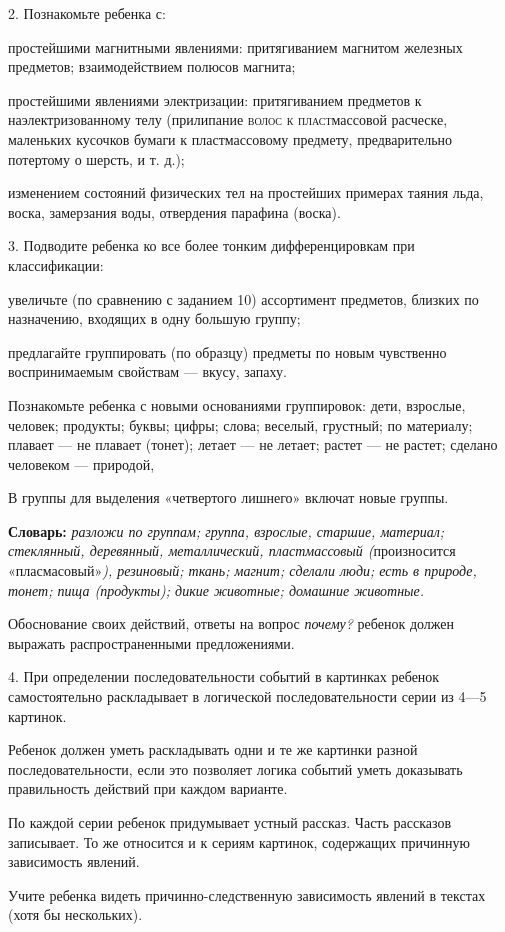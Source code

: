 \documentclass{book}
\renewcommand{\emph}[1]{\textit{#1}}
\begin{document}
2. Познакомьте ребенка с:

простейшими магнитными явлениями: притягиванием магнитом железных
предметов; взаимодействием полюсов магнита;

простейшими явлениями электризации: притягиванием предметов к
наэлектризованному телу (прилипание \textsc{волос к пласт}массовой
расческе, маленьких кусочков бумаги к пластмассовому предмету,
предварительно потертому о шерсть, и т. д.);

изменением состояний физических тел на простейших примерах таяния льда,
воска, замерзания воды, отвердения парафина (воска).

3. Подводите ребенка ко все более тонким дифференцировкам при
классификации:

увеличьте (по сравнению с заданием 10) ассортимент предметов, близких по
назначению, входящих в одну большую группу;

предлагайте группировать (по образцу) предметы по новым чувственно
воспринимаемым свойствам --- вкусу, запаху.

Познакомьте ребенка с новыми основаниями группировок: дети, взрослые,
человек; продукты; буквы; цифры; слова; веселый, грустный; по материалу;
плавает --- не плавает (тонет); летает --- не летает; растет --- не
растет; сделано человеком --- природой,

В группы для выделения «четвертого лишнего» включат новые группы.

\textbf{Словарь:} \emph{разложи по группам; группа, взрослые, старшие,
материал; стеклянный, деревянный, металлический, пластмассовый
(}произносится «пласмасовый»\emph{), резиновый; ткань; магнит; сделали
люди; есть в природе, тонет; пища (продукты); дикие животные; домашние
животные.}

Обоснование своих действий, ответы на вопрос \emph{почему?} ребенок
должен выражать распространенными предложениями.

4. При определении последовательности событий в картинках ребенок
самостоятельно раскладывает в логической последовательности серии из
4---5 картинок.

Ребенок должен уметь раскладывать одни и те же картинки разной
последовательности, если это позволяет логика событий уметь доказывать
правильность действий при каждом варианте.

По каждой серии ребенок придумывает устный рассказ. Часть рассказов
записывает. То же относится и к сериям картинок, содержащих причинную
зависимость явлений.

Учите ребенка видеть причинно-следственную зависимость явлений в текстах
(хотя бы нескольких).
\end{document}
